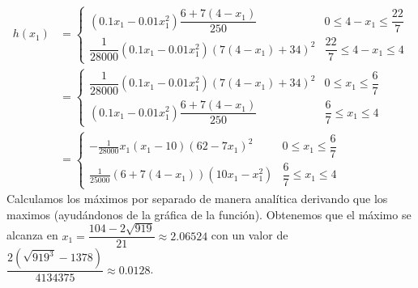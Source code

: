 \documentclass[twoside]{article}
\begin{document}
\begin{solucion}
\begin{itemize}
\begin{align*}
h(x_1) &= \left\{\begin{array}{ll}
(0.1x_1-0.01x_1^2)\dfrac{6+7(4-x_1)}{250} & 0\leq 4-x_1 \leq \dfrac{22}{7}\\
\dfrac{1}{28000}(0.1x_1-0.01x_1^2){(7(4-x_1)+34)^2}& \dfrac{22}{7} \leq 4-x_1 \leq 4
\end{array}\right.\\
&=\left\{\begin{array}{ll}
\dfrac{1}{28000}(0.1x_1-0.01x_1^2)(7(4-x_1)+34)^2& 0 \leq x_1 \leq \dfrac{6}{7}\\
(0.1x_1-0.01x_1^2)\dfrac{6+7(4-x_1)}{250} & \dfrac{6}{7} \leq x_1 \leq 4
\end{array}\right.\\
&=\left\{\begin{array}{ll}
-\frac{1}{28000}x_1 (x_1 - 10) (62 - 7 x_1)^2& 0 \leq x_1 \leq \dfrac{6}{7}\\
\frac{1}{25000}(6 + 7 (4 - x_1)) (10 x_1 - x_1^2) & \dfrac{6}{7} \leq x_1 \leq 4
\end{array}\right.
\end{align*}
Calculamos los máximos por separado de manera analítica derivando que los maximos (ayudándonos de la gráfica de la función). Obtenemos que el máximo se alcanza en $x_1=\dfrac{104-2\sqrt{919}}{21}\approx 2.06524$ con un valor de $\dfrac{2(\sqrt{919^3}-1378)}{4134375}\approx0.0128$.
\end{itemize}
\end{solucion}

\newpage
\end{document}
